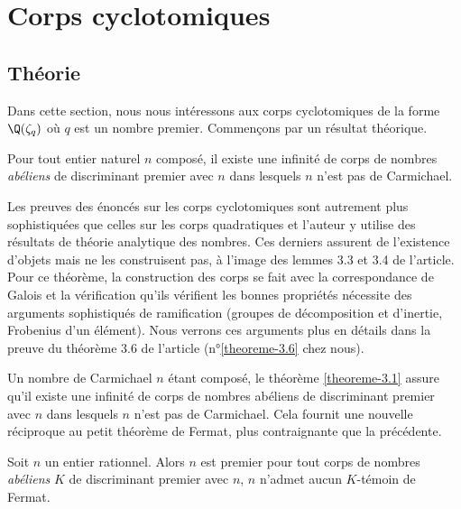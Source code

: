 \section{Corps cyclotomiques}

\subsection{Théorie}

Dans cette section, nous nous intéressons aux corps cyclotomiques de la forme $\Q(\zeta_q)$ où $q$ est un nombre premier. Commençons par un résultat théorique.

\begin{theoreme}\label{theoreme-3.1}
	Pour tout entier naturel $n$ composé, il existe une infinité de corps de nombres \emph{abéliens} de discriminant premier avec $n$ dans lesquels $n$ n'est pas de Carmichael.
\end{theoreme}

\begin{MotSurPreuve}
	Les preuves des énoncés sur les corps cyclotomiques sont autrement plus sophistiquées que celles sur les corps quadratiques et l'auteur y utilise des résultats de théorie analytique des nombres. Ces derniers assurent de l'existence d'objets mais ne les construisent pas, à l'image des lemmes 3.3 et 3.4 de l'article. Pour ce théorème, la construction des corps se fait avec la correspondance de Galois et la vérification qu'ils vérifient les bonnes propriétés nécessite des arguments sophistiqués de ramification (groupes de décomposition et d'inertie, Frobenius d'un élément). Nous verrons ces arguments plus en détails dans la preuve du théorème 3.6 de l'article (n°\ref{theoreme-3.6} chez nous). \\
\end{MotSurPreuve}

Un nombre de Carmichael $n$ étant composé, le théorème \ref{theoreme-3.1} assure qu'il existe une infinité de corps de nombres abéliens de discriminant premier avec $n$ dans lesquels $n$ n'est pas de Carmichael. Cela fournit une nouvelle réciproque au petit théorème de Fermat, plus contraignante que la précédente.

\begin{theoreme}\label{reciproque-2}
	Soit $n$ un entier rationnel. Alors $n$ est premier \ssi pour tout corps de nombres \emph{abéliens} $K$ de discriminant premier avec $n$, $n$ n'admet aucun $K$-témoin de Fermat.
\end{theoreme}

